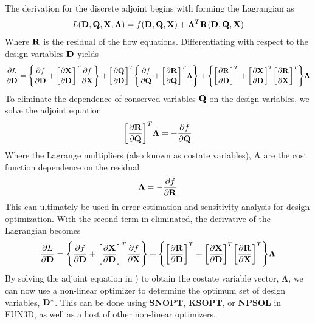 The derivation for the discrete adjoint begins with forming the Lagrangian as
\begin{equation}
  L(\mathbf D,\mathbf Q,\mathbf X,\mathbf{\Lambda})=f(\mathbf D,\mathbf Q,\mathbf X)
  +\mathbf{\Lambda}^T\mathbf R(\mathbf D,\mathbf Q,\mathbf X)
  \label{lagrangian}
\end{equation}
Where $\mathbf R$ is the residual of the flow equations.  Differentiating with respect
to the design variables $\mathbf D$ yields
\begin{equation}
  \frac{\partial L}{\partial \mathbf D} = 
  \Bigg\{\frac{\partial f}{\partial \mathbf D}+\bigg[\frac{\partial \mathbf X}{\partial \mathbf D}\bigg]^T \frac{\partial f}{\partial \mathbf X}\Bigg\} 
  + \bigg[\frac{\partial \mathbf Q}{\partial \mathbf D}\bigg]^T
  \Bigg\{\frac{\partial f}{\partial \mathbf Q}+\bigg[\frac{\partial \mathbf R}{\partial \mathbf Q}\bigg]^T \mathbf{\Lambda}\Bigg\}
  +\Bigg\{\bigg[\frac{\partial \mathbf R}{\partial \mathbf D}\bigg]^T
  +\bigg[\frac{\partial \mathbf X}{\partial \mathbf D}\bigg]^T\bigg[\frac{\partial \mathbf R}{\partial \mathbf X}\bigg]^T\Bigg\}\mathbf{\Lambda}
  \label{dL}
\end{equation}
To eliminate the dependence of conserved variables $\mathbf Q$ on the design
variables, we solve the adjoint equation
\begin{equation}
  \bigg[\frac{\partial \mathbf R}{\partial \mathbf Q}\bigg]^T\mathbf{\Lambda} = -\frac{\partial f}{\partial \mathbf Q}
  \label{adjoint-main}
\end{equation}
Where the Lagrange multipliers (also known as costate variables),
$\mathbf{\Lambda}$ are the cost function dependence on the residual
\begin{equation}
  \mathbf{\Lambda}=-\frac{\partial f}{\partial \mathbf R}
\end{equation}
This can ultimately be used in error estimation and sensitivity analysis for
design optimization.  With the second term in  eliminated, the
derivative of the Lagrangian becomes
\begin{equation}
  \frac{\partial L}{\partial \mathbf D}=
  \Bigg\{\frac{\partial f}{\partial \mathbf D}+\bigg[\frac{\partial \mathbf X}{\partial \mathbf D}\bigg]^T \frac{\partial f}{\partial \mathbf X}\Bigg\}
  +\Bigg\{\bigg[\frac{\partial \mathbf R}{\partial \mathbf D}\bigg]^T
  +\bigg[\frac{\partial \mathbf X}{\partial \mathbf D}\bigg]^T\bigg[\frac{\partial \mathbf R}{\partial \mathbf X}\bigg]^T\Bigg\}\mathbf{\Lambda}
  \label{obj-function}
\end{equation}
By solving the adjoint equation in ) to obtain the costate
variable vector, $\mathbf{\Lambda}$, we can now use a non-linear optimizer to
determine the optimum set of design variables, $\mathbf D^*$. This can be done using
{\bf SNOPT\cite{snopt-manual}}, {\bf KSOPT\cite{KSOPT}}, or {\bf
  NPSOL\cite{npsol-manual}} in FUN3D, as well as a host of other non-linear
  optimizers.

